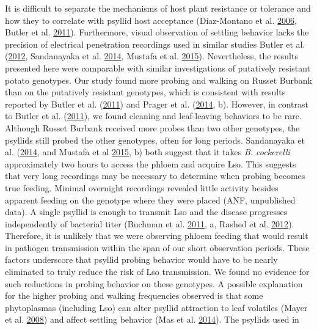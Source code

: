 \documentclass[]{article}
\begin{document}
It is difficult to separate the mechanisms of host plant resistance or
tolerance and how they to correlate with psyllid host acceptance
(Diaz-Montano et al. \protect\hyperlink{ref-Diaz-Montano2006}{2006},
Butler et al. \protect\hyperlink{ref-Butler2011}{2011}). Furthermore,
visual observation of settling behavior lacks the precision of
electrical penetration recordings used in similar studies Butler et al.
(\protect\hyperlink{ref-Butler2012b}{2012}, Sandanayaka et al.
\protect\hyperlink{ref-Sandanayaka2014}{2014}, Mustafa et al.
\protect\hyperlink{ref-Mustafa2015b}{2015}). Nevertheless, the results
presented here were comparable with similar investigations of putatively
resistant potato genotypes. Our study found more probing and walking on
Russet Burbank than on the putatively resistant genotypes, which is
consistent with results reported by Butler et al.
(\protect\hyperlink{ref-Butler2011}{2011}) and Prager et al.
(\protect\hyperlink{ref-Prager2014b}{2014}, b). However, in contrast to
Butler et al. (\protect\hyperlink{ref-Butler2011}{2011}), we found
cleaning and leaf-leaving behaviors to be rare. Although Russet Burbank
received more probes than two other genotypes, the psyllids still probed
the other genotypes, often for long periods. Sandanayaka et al.
(\protect\hyperlink{ref-Sandanayaka2014}{2014}, and Mustafa et al
\protect\hyperlink{ref-Mustafa2015b}{2015}, b) both suggest that it
takes \emph{B. cockerelli} approximately two hours to access the phloem
and acquire Lso. This suggests that very long recordings may be
necessary to determine when probing becomes true feeding. Minimal
overnight recordings revealed little activity besides apparent feeding
on the genotype where they were placed (ANF, unpublished data). A single
psyllid is enough to transmit Lso and the disease progresses
independently of bacterial titer (Buchman et al.
\protect\hyperlink{ref-Buchman2011a}{2011}, a, Rashed et al.
\protect\hyperlink{ref-Rashed2012}{2012}). Therefore, it is unlikely
that we were observing phloem feeding that would result in pathogen
transmission within the span of our short observation periods. These
factors underscore that psyllid probing behavior would have to be nearly
eliminated to truly reduce the risk of Lso transmission. We found no
evidence for such reductions in probing behavior on these genotypes. A
possible explanation for the higher probing and walking frequencies
observed is that some phytoplasmas (including Lso) can alter psyllid
attraction to leaf volatiles (Mayer et al.
\protect\hyperlink{ref-Mayer2008}{2008}) and affect settling behavior
(Mas et al. \protect\hyperlink{ref-Mas2014}{2014}). The psyllids used in
\end{document}
